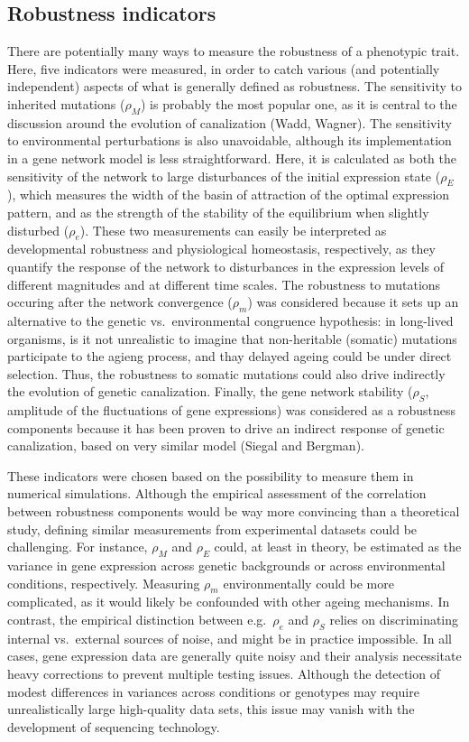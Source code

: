 \documentclass[10pt,a4paper]{article}
\newcommand{\stability}{{\rho_S}}
\newcommand{\earlyenv}{{\rho_E}}
\newcommand{\lateenv}{{\rho_e}}
\newcommand{\earlymut}{{\rho_M}}
\newcommand{\latemut}{{\rho_m}}
\begin{document}
\subsection{Robustness indicators}

There are potentially many ways to measure the robustness of a phenotypic trait. Here, five indicators were measured, in order to catch various (and potentially independent) aspects of what is generally defined as robustness. The sensitivity to inherited mutations ($\earlymut$) is probably the most popular one, as it is central to the discussion around the evolution of canalization (Wadd, Wagner). The sensitivity to environmental perturbations is also unavoidable, although its implementation in a gene network model is less straightforward. Here, it is calculated as both the sensitivity of the network to large disturbances of the initial expression state ($\earlyenv$), which measures the width of the basin of attraction of the optimal expression pattern, and as the strength of the stability of the equilibrium when slightly disturbed ($\lateenv$). These two measurements can easily be interpreted as developmental robustness and physiological homeostasis, respectively, as they quantify the response of the network to disturbances in the expression levels of different magnitudes and at different time scales. The robustness to mutations occuring after the network convergence ($\latemut$) was considered because it sets up an alternative to the genetic vs.\ environmental congruence hypothesis: in long-lived organisms, is it not unrealistic to imagine that non-heritable (somatic) mutations participate to the agieng process, and thay delayed ageing could be under direct selection. Thus, the robustness to somatic mutations could also drive indirectly the evolution of genetic canalization. Finally, the gene network stability ($\stability$, amplitude of the fluctuations of gene expressions) was considered as a robustness components because it has been proven to drive an indirect response of genetic canalization, based on very similar model (Siegal and Bergman). 

These indicators were chosen based on the possibility to measure them in numerical simulations. Although the empirical assessment of the correlation between robustness components would be way more convincing than a theoretical study, defining similar measurements from experimental datasets could be challenging. For instance, $\earlymut$ and $\earlyenv$ could, at least in theory, be estimated as the variance in gene expression across genetic backgrounds or across environmental conditions, respectively. Measuring $\latemut$ environmentally could be more complicated, as it would likely be confounded with other ageing mechanisms. In contrast, the empirical distinction between e.g.\ $\lateenv$ and $\stability$ relies on discriminating internal vs.\ external sources of noise, and might be in practice impossible. In all cases, gene expression data are generally quite noisy and their analysis necessitate heavy corrections to prevent multiple testing issues. Although the detection of modest differences in variances across conditions or genotypes may require unrealistically large high-quality data sets, this issue may vanish with the development of sequencing technology. 
\end{document}
